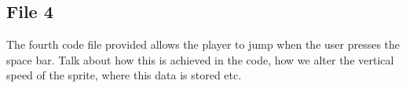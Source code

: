 \documentclass[12pt]{article}
\begin{document}
\newpage

\subsection*{File 4}
The fourth code file provided allows the player to jump when the user presses the space bar. Talk about how this is achieved in the code, how we alter the
vertical speed of the sprite, where this data is stored etc.
\end{document}
